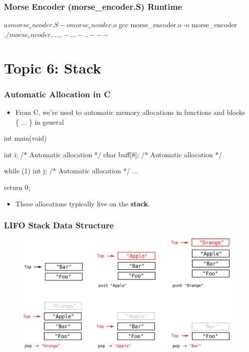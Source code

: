 \documentclass[11pt,xcolor=dvipsnames]{beamer}
\newcommand{\mvs}{\vspace{-0.95em}}
\begin{document}
\begin{frame}[fragile,t]
\frametitle{Morse Encoder (morse\_encoder.S) Runtime}
\mvs
\begin{textcode}
$ as morse_encoder.S -o morse_encoder.o
$ gcc morse_encoder.o -o morse_encoder
$ ./morse_encoder
....   .   .-..   .-..   ---   
$
\end{textcode}
\end{frame}

\section{Topic 6: Stack}

\begin{frame}[fragile,t]
\frametitle{Automatic Allocation in C}
\begin{itemize}
  \item From C, we're used to automatic memory allocations in functions and blocks \{ ... \} in general
\end{itemize}
\begin{ccode}
int main(void) {
  int i;            /* Automatic allocation */
  char buff[8];     /* Automatic allocation */

  while (1) {
    int j;          /* Automatic allocation */
    ...
  }

  return 0;
}
\end{ccode}
\begin{itemize}
  \item These allocations typically live on the {\bf stack}.
\end{itemize}
\end{frame}

\begin{frame}[fragile,t]
\frametitle{LIFO Stack Data Structure}
\begin{figure}
\centering
\includegraphics[height=0.60\paperheight]{figures/lifostack.png}
\end{figure}
\end{frame}
\end{document}
